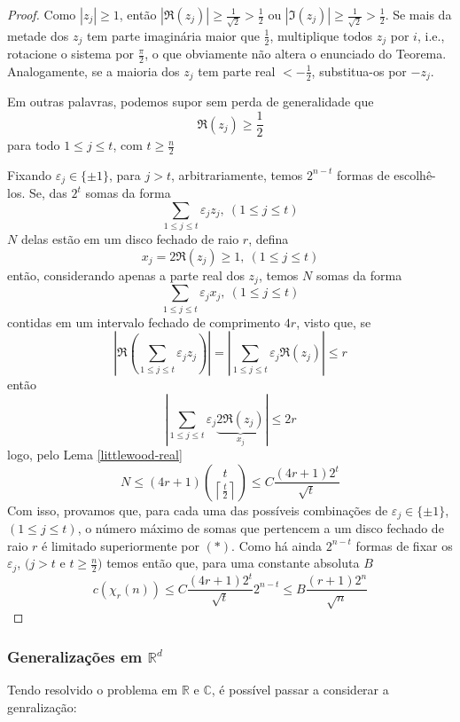 \documentclass[11pt]{article}
\newcommand{\mbb}[1]{\mathbb{#1}}
\newcommand{\rp}[1]{{\left(#1\right)}}
\newcommand\ceil[1]{{\left\lceil#1\right\rceil}}
\begin{document}
\begin{proof}
    Como $|z_j|\geq1$, então $|\Re(z_j)|\geq\frac{1}{\sqrt{2}}>\frac12$ ou $|\Im(z_j)|\geq\frac{1}{\sqrt{2}}>\frac12$. Se mais da metade dos $z_j$ tem parte imaginária maior que $\frac12$, multiplique todos $z_j$ por $i$, i.e., rotacione o sistema por $\frac\pi2$, o que obviamente não altera o enunciado do Teorema. Analogamente, se a maioria dos $z_j$ tem parte real $<-\frac12$, substitua-os por $-z_j$.
    
    Em outras palavras, podemos supor sem perda de generalidade que
    $$\Re(z_j)\geq\frac12$$
    para todo $1\leq j\leq t$, com $t\geq\frac{n}{2}$

    Fixando $\varepsilon_j\in\{\pm1\}$, para $j>t$, arbitrariamente, temos $2^{n-t}$ formas de escolhê-los. Se, das $2^t$ somas da forma
    $$\sum_{1\leq j\leq t}\varepsilon_jz_j,~(1\leq j\leq t)$$
    $N$ delas estão em um disco fechado de raio $r$, defina
    $$x_j=2\Re(z_j)\geq1,~(1\leq j\leq t)$$
    então, considerando apenas a parte real dos $z_j$, temos $N$ somas da forma
    $$\sum_{1\leq j\leq t}\varepsilon_jx_j,~(1\leq j\leq t)$$
    contidas em um intervalo fechado de comprimento $4r$, visto que, se
    $$\left|\Re\rp{\sum_{1\leq j\leq t}\varepsilon_jz_j}\right|=\left|\sum_{1\leq j\leq t}\varepsilon_j\Re(z_j)\right|\leq r$$
    então
    $$\left|\sum_{1\leq j\leq t}\varepsilon_j \underbrace{2\Re(z_j)}_{x_j}\right|\leq 2r$$
    logo, pelo Lema \ref{littlewood-real}
    \begin{equation}
    N\leq (4r+1)\binom{t}{\ceil{\frac{t}{2}}}\leq C\frac{(4r+1)2^t}{\sqrt{t}}\tag{$*$}
    \end{equation}
    Com isso, provamos que, para cada uma das possíveis combinações de $\varepsilon_j\in\{\pm1\}$, $(1\leq j\leq t)$, o número máximo de somas que pertencem a um disco fechado de raio $r$ é limitado superiormente por $(*)$. Como há ainda $2^{n-t}$ formas de fixar os $\varepsilon_j$, $(j>t$ e $t\geq\frac{n}{2})$ temos então que, para uma constante absoluta $B$
    $$c(\chi_r(n))\leq C\frac{(4r+1)2^t}{\sqrt{t}}2^{n-t}\leq B\frac{(r+1)2^n}{\sqrt{n}}$$
\end{proof}

\subsubsection{Generalizações em $\mbb{R}^d$}

Tendo resolvido o problema em $\mbb{R}$ e $\mbb{C}$, é possível passar a considerar a genralização:
\end{document}
